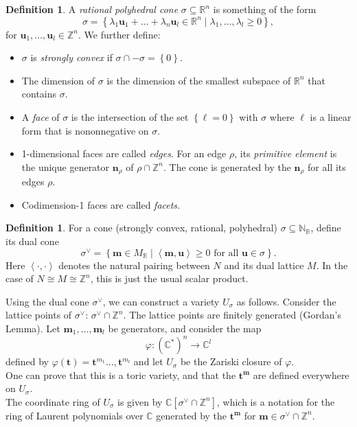 \documentclass[a4paper]{article}
\theoremstyle{definition}
\newtheorem{definition}[theorem]{Definition}
\begin{document}
  \begin{definition}
    A \emph{rational polyhedral cone} $\sigma \subseteq \mathbb{R}^{n}$ is something of the form
    \[
      \sigma = \left\{ \lambda_{1}\boldsymbol{u} _{1} + \dots + \lambda_{n}\boldsymbol{u} _{l} \in \mathbb{R}^{n}\mid \lambda_{1}, \dots, \lambda_{l} \geq 0\right\},
    \]
    for $\boldsymbol{u} _{1}, \dots, \boldsymbol{u} _{l} \in \mathbb{Z}^{n}$. We further define:
    \begin{itemize}
      \item $\sigma $ is \emph{strongly convex} if $\sigma \cap - \sigma = \left\{ 0\right\} $.
      \item The dimension of $\sigma$ is the dimension of the smallest subspace of $\mathbb{R}^{n}$ that contains $\sigma$.
      \item A \emph{face} of $\sigma$ is the intersection of the set $\left\{\ell = 0\right\}$ with $\sigma$ where $\ell$ is a linear form that is nononnegative on $\sigma$.
      \item 1-dimensional faces are called \emph{edges}. For an edge $\rho$, its  \emph{primitive element} is the unique generator $\boldsymbol{n} _{\rho}$ of $\rho \cap \mathbb{Z}^{n}$. The cone is generated by the $\boldsymbol{n} _{\rho}$ for all its edges $\rho$.
      \item Codimension-1 faces are called \emph{facets.} 
    \end{itemize}
  \end{definition}
  

  \begin{definition}
    For a cone (strongly convex, rational, polyhedral) $\sigma \subseteq \mathbb{N}_{\mathbb{R}}$, define its dual cone 
    \[
      \sigma ^{ \vee} = \left\{ \boldsymbol{m} \in M_{\mathbb{R}}\mid \left\langle \boldsymbol{m} ,\boldsymbol{u}  \right\rangle\geq 0 \text{ for all } \boldsymbol{ u } \in \sigma\right\}.
    \]
    Here $\left\langle \cdot, \cdot \right\rangle$ denotes the natural pairing between $N$ and its dual lattice $M$. In the case of $N \cong M \cong \mathbb{Z}^{n}$, this is just the usual scalar product. 
  \end{definition}

  Using the dual cone $\sigma^{\vee}$, we can construct a variety $U_{\sigma}$ as follows. Consider the lattice points of $\sigma^{\vee}$: $\sigma^{\vee} \cap \mathbb{Z}^{n}$. The lattice points are finitely generated (Gordan's Lemma). Let $\boldsymbol{m} _{1}, \dots, \boldsymbol{m} _{l}$ be generators, and consider the map 
  \[
    \varphi \colon \left( \mathbb{C}^{*} \right) ^{n} \rightarrow  \mathbb{C}^{l}
  \]
  defined by $\varphi \left( \boldsymbol{t}  \right) = \boldsymbol{t} ^{m_{1}} \dots, \boldsymbol{t} ^{m_{l}}$ and let $U_{\sigma}$ be the Zariski closure of $\varphi$.\\
  One can prove that this is a toric variety, and that the $\boldsymbol{t^{m}} $ are defined everywhere on $U_{\sigma}$.\\
  The coordinate ring of $U_{\sigma}$ is given by $\mathbb{C} \left[ \sigma^{\vee} \cap \mathbb{Z}^{n} \right]$, which is a notation for the ring of Laurent polynomials over $\mathbb{C}$ generated by the $\boldsymbol{t^{m}} $ for $\boldsymbol{m}  \in \sigma^{\vee }\cap\mathbb{Z}^{n}$.
\end{document}
